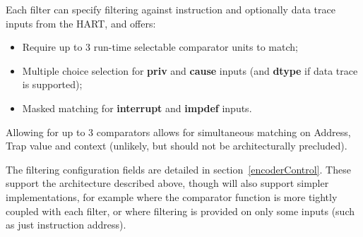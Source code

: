Each filter can specify filtering against instruction and optionally data trace inputs from the HART, and offers:

\begin{itemize}
  \item Require up to 3 run-time selectable comparator units to match;
  \item Multiple choice selection for \textbf{priv} and \textbf{cause} inputs (and \textbf{dtype} if data trace is supported);
  \item Masked matching for \textbf{interrupt} and \textbf{impdef} inputs.
\end{itemize}

Allowing for up to 3 comparators allows for simultaneous matching on Address, Trap value and context (unlikely, but should not 
be architecturally precluded).

The filtering configuration fields are detailed in section~\ref{encoderControl}.  These support the architecture described 
above, though will also support simpler implementations, for example where the comparator function is more tightly coupled with
each filter, or where filtering is provided on only some inputs (such as just instruction address).


